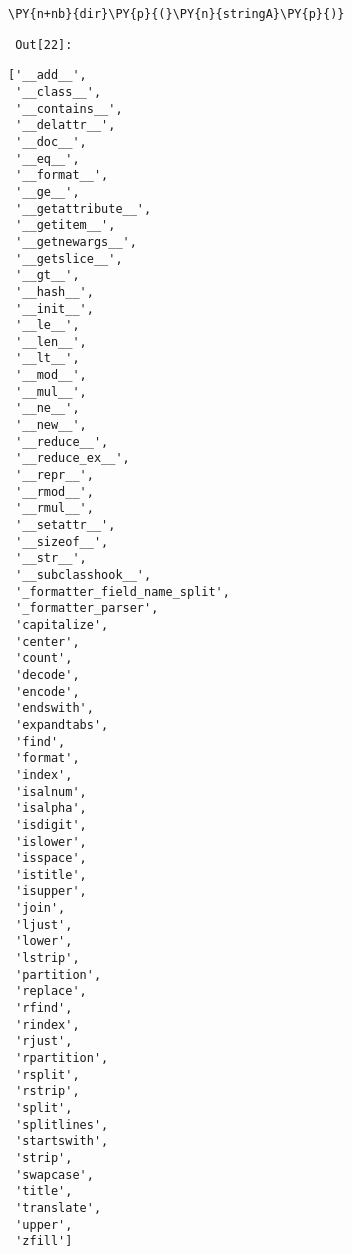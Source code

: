 {\par%
\vspace{-1\baselineskip}%
}%
\begin{notebookcell}[22]%
\begin{addmargin}[\cellleftmargin]{0em}%
{\smaller%
\par%
%
\vspace{-1\smallerfontscale}%
\begin{Verbatim}[commandchars=\\\{\}]
\PY{n+nb}{dir}\PY{p}{(}\PY{n}{stringA}\PY{p}{)}
\end{Verbatim}
%
\par%
\vspace{-1\smallerfontscale}}%
\end{addmargin}
\end{notebookcell}

\par\vspace{1\smallerfontscale}%
    
        {\par%
        \vspace{-1\smallerfontscale}%
        \noindent%
        \begin{minipage}{\cellleftmargin}%
    \hfill%
    {\smaller%
    \tt%
    \color{nbframe-out-prompt}%
    Out[22]:}%
    \hspace{\inputpadding}%
    \hspace{0em}%
    \hspace{3pt}%
    \end{minipage}%
        }%
    \begin{addmargin}[\cellleftmargin]{0em}%
    {\smaller%
    \vspace{-1\smallerfontscale}%
    
    
    
    \begin{verbatim}
['__add__',
 '__class__',
 '__contains__',
 '__delattr__',
 '__doc__',
 '__eq__',
 '__format__',
 '__ge__',
 '__getattribute__',
 '__getitem__',
 '__getnewargs__',
 '__getslice__',
 '__gt__',
 '__hash__',
 '__init__',
 '__le__',
 '__len__',
 '__lt__',
 '__mod__',
 '__mul__',
 '__ne__',
 '__new__',
 '__reduce__',
 '__reduce_ex__',
 '__repr__',
 '__rmod__',
 '__rmul__',
 '__setattr__',
 '__sizeof__',
 '__str__',
 '__subclasshook__',
 '_formatter_field_name_split',
 '_formatter_parser',
 'capitalize',
 'center',
 'count',
 'decode',
 'encode',
 'endswith',
 'expandtabs',
 'find',
 'format',
 'index',
 'isalnum',
 'isalpha',
 'isdigit',
 'islower',
 'isspace',
 'istitle',
 'isupper',
 'join',
 'ljust',
 'lower',
 'lstrip',
 'partition',
 'replace',
 'rfind',
 'rindex',
 'rjust',
 'rpartition',
 'rsplit',
 'rstrip',
 'split',
 'splitlines',
 'startswith',
 'strip',
 'swapcase',
 'title',
 'translate',
 'upper',
 'zfill']
    \end{verbatim}

    
}%
    \end{addmargin}%

